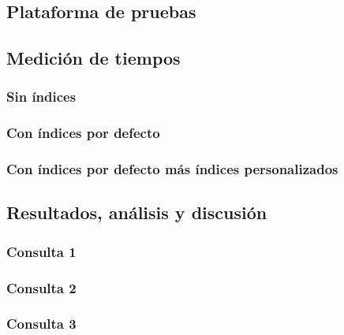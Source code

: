 \subsection{Plataforma de pruebas}

\subsection{Medición de tiempos}
\subsubsection{Sin índices}

\subsubsection{Con índices por defecto}

\subsubsection{Con índices por defecto más índices personalizados}

\subsection{Resultados, análisis y discusión}
\subsubsection{Consulta 1}
\subsubsection{Consulta 2}
\subsubsection{Consulta 3}
